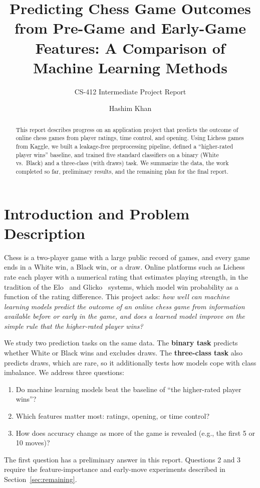 \documentclass[sigconf]{acmart}
\begin{document}
\title[Predicting Chess Outcomes]{Predicting Chess Game Outcomes from Pre-Game and Early-Game Features: A Comparison of Machine Learning Methods}
\subtitle{CS-412 Intermediate Project Report}

\author{Hashim Khan}

\renewcommand{\shortauthors}{Khan}

\begin{abstract}
This report describes progress on an application project that predicts the outcome of online chess games from player ratings, time control, and opening. Using \nGames{} Lichess games from Kaggle, we built a leakage-free preprocessing pipeline, defined a ``higher-rated player wins'' baseline, and trained five standard classifiers on a binary (White vs.\ Black) and a three-class (with draws) task. We summarize the data, the work completed so far, preliminary results, and the remaining plan for the final report.
\end{abstract}

\maketitle

\section{Introduction and Problem Description}
Chess is a two-player game with a large public record of games, and every game ends in a White win, a Black win, or a draw. Online platforms such as Lichess rate each player with a numerical rating that estimates playing strength, in the tradition of the Elo~\cite{elo} and Glicko~\cite{glicko} systems, which model win probability as a function of the rating difference. This project asks: \emph{how well can machine learning models predict the outcome of an online chess game from information available before or early in the game, and does a learned model improve on the simple rule that the higher-rated player wins?}

We study two prediction tasks on the same data. The \textbf{binary task} predicts whether White or Black wins and excludes draws. The \textbf{three-class task} also predicts draws, which are rare, so it additionally tests how models cope with class imbalance. We address three questions:
\begin{enumerate}
  \item Do machine learning models beat the baseline of ``the higher-rated player wins''?
  \item Which features matter most: ratings, opening, or time control?
  \item How does accuracy change as more of the game is revealed (e.g., the first 5 or 10 moves)?
\end{enumerate}
The first question has a preliminary answer in this report. Questions 2 and 3 require the feature-importance and early-move experiments described in Section~\ref{sec:remaining}.
\end{document}

